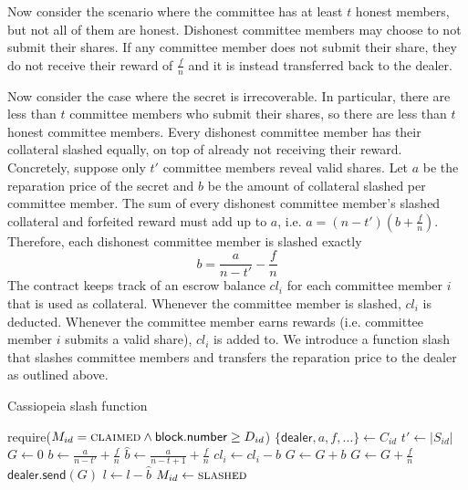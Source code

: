 Now consider the scenario where the committee has at least $t$ honest members, but not all of them are honest.
Dishonest committee members may choose to not submit their shares.
If any committee member does not submit their share, they do not receive their reward of $\frac{f}{n}$ and it is instead transferred back to the dealer.

Now consider the case where the secret is irrecoverable.
In particular, there are less than $t$ committee members who submit their shares, so there are less than $t$ honest committee members.
Every dishonest committee member has their collateral slashed equally, on top of already not receiving their reward.
Concretely, suppose only $t'$ committee members reveal valid shares.
Let $a$ be the reparation price of the secret and $b$ be the amount of collateral slashed per committee member.
The sum of every dishonest committee member's slashed collateral and forfeited reward must add up to $a$, i.e. $a = (n - t')(b + \frac{f}{n})$.
Therefore, each dishonest committee member is slashed exactly
\begin{equation}\label{eq:slash_amount}
    b = \frac{a}{n - t'} - \frac{f}{n}
\end{equation}
The contract keeps track of an escrow balance $cl_i$ for each committee member $i$ that is used as collateral.
Whenever the committee member is slashed, $cl_i$ is deducted.
Whenever the committee member earns rewards (i.e. committee member $i$ submits a valid share), $cl_i$ is added to.
We introduce a function \textsf{slash} that slashes committee members and transfers the reparation price to the dealer as outlined above.

\begin{algorithm}[H]
\caption{Cassiopeia \textsf{slash} function}
\label{alg:slash}
    \begin{algorithmic}[1]
                \State require($M_{id} = \textsc{claimed} \land \textsf{block.number} \geq D_{id}$)
                \State $\{\textsf{dealer}, a, f, \dots\} \gets C_{id}$
                \State $t' \gets |S_{id}|$
                \State $G \gets 0$
                \State $b \gets \frac{a}{n - t'} + \frac{f}{n}$ 
                \State $\hat{b} \gets \frac{a}{n - t + 1} + \frac{f}{n}$ 
                            \State $cl_i \gets cl_i - b$
                            \State $G \gets G + b$
                        \EndIf
                        \State $G \gets G + \frac{f}{n}$
                    \EndIf
                \EndFor
                \State $\textsf{dealer.send}(G)$
                \State $l \gets l - \hat{b}$ 
                \State $M_{id} \gets \textsc{slashed}$
            \EndFunction
    \end{algorithmic}
\end{algorithm}

